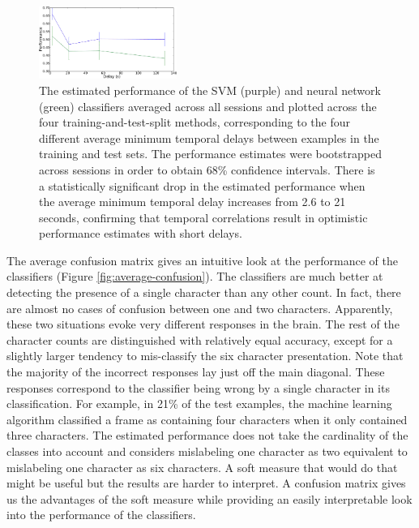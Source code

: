 \documentclass[review,1p,authoryear]{elsarticle}
\begin{document}
\begin{figure}
\centering
\includegraphics[width=0.4\textwidth]{figures/performance-verse-temporal-distance}
\caption{The estimated performance of the SVM (purple) and neural network (green) classifiers averaged across all sessions and plotted across the four training-and-test-split methods, corresponding to the four different average minimum temporal delays between examples in the training and test sets. 
The performance estimates were bootstrapped across sessions in order to obtain 68\% confidence intervals.
There is a statistically significant drop in the estimated performance when the average minimum temporal delay increases from 2.6 to 21 seconds, confirming that temporal correlations result in optimistic performance estimates with short delays.}
\label{fig:performance-verse-temporal-distance}
\end{figure}

The average confusion matrix gives an intuitive look at the performance of the classifiers (Figure \ref{fig:average-confusion}).
The classifiers are much better at detecting the presence of a single character than any other count.
In fact, there are almost no cases of confusion between one and two characters.
Apparently, these two situations evoke very different responses in the brain.
The rest of the character counts are distinguished with relatively equal accuracy,
except for a slightly larger tendency to mis-classify the six character presentation.
Note that the majority of the incorrect responses lay just off the main diagonal.
These responses correspond to the classifier being wrong by a single character in its classification.
For example, in 21\% of the test examples, the machine learning algorithm classified a frame as containing four characters when it only contained three characters.
The estimated performance does not take the cardinality of the classes into account and considers mislabeling one character as two equivalent to mislabeling one character as six characters.
A soft measure that would do that might be useful but the results are harder to interpret.
A confusion matrix gives us the advantages of the soft measure while providing an easily interpretable look into the performance of the classifiers.
\end{document}
